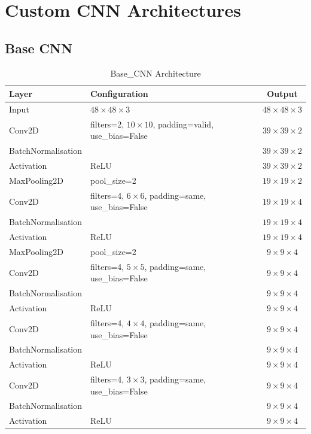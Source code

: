 \documentclass[12pt, a4paper]{report}
\let\oldsection\section
\renewcommand{\section}{%
    \Needspace{6\baselineskip}%
    \oldsection
}
\let\oldsubsection\subsection
\renewcommand{\subsection}{%
    \Needspace{6\baselineskip}%
    \oldsubsection
}
\begin{document}
		\section{Custom CNN Architectures}
			
			\subsection{Base CNN}
			
				\begin{table}[H]
					\centering
					\caption{Base\_CNN Architecture}
					\label{tab:base_cnn}
					\begin{tabular}{lp{6cm}c}
						\toprule
						Layer & Configuration & Output  \\	
						\midrule
						Input & $48\times48\times3$ & $48\times48\times3$ \\
						Conv2D & filters=2, $10\times10$, padding=valid, use\_bias=False & $39\times39\times2$ \\
						BatchNormalisation &  & $39\times39\times2$ \\
						Activation & ReLU & $39\times39\times2$ \\
						MaxPooling2D & pool\_size=2 & $19\times19\times2$ \\
						Conv2D & filters=4, $6\times6$, padding=same, use\_bias=False & $19\times19\times4$ \\
						BatchNormalisation &  & $19\times19\times4$ \\
						Activation & ReLU & $19\times19\times4$ \\
						MaxPooling2D & pool\_size=2 & $9\times9\times4$ \\
						Conv2D & filters=4, $5\times5$, padding=same, use\_bias=False & $9\times9\times4$ \\
						BatchNormalisation &  & $9\times9\times4$ \\
						Activation & ReLU & $9\times9\times4$ \\
						Conv2D & filters=4, $4\times4$, padding=same, use\_bias=False & $9\times9\times4$ \\
						BatchNormalisation &  & $9\times9\times4$ \\
						Activation & ReLU & $9\times9\times4$ \\
						Conv2D & filters=4, $3\times3$, padding=same, use\_bias=False & $9\times9\times4$ \\
						BatchNormalisation &  & $9\times9\times4$ \\
						Activation & ReLU & $9\times9\times4$ \\

\end{tabular}
\end{table}
\end{document}
